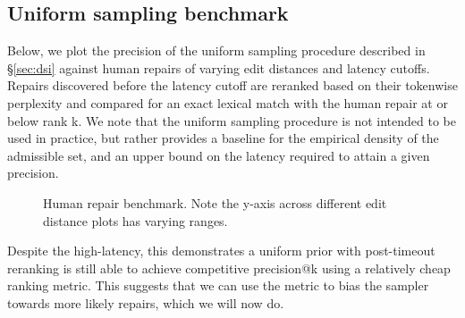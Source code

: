 \documentclass[sigplan,review,anonymous,acmsmall]{acmart}\settopmatter{printfolios=false,printccs=false,printacmref=false}
\begin{document}
\subsection{Uniform sampling benchmark}\label{sec:uniform}

Below, we plot the precision of the uniform sampling procedure described in \S\ref{sec:dsi} against human repairs of varying edit distances and latency cutoffs. Repairs discovered before the latency cutoff are reranked based on their tokenwise perplexity and compared for an exact lexical match with the human repair at or below rank k. We note that the uniform sampling procedure is not intended to be used in practice, but rather provides a baseline for the empirical density of the admissible set, and an upper bound on the latency required to attain a given precision.

\begin{figure}[H]
\resizebox{.3\textwidth}{!}{}
\resizebox{.3\textwidth}{!}{}
\resizebox{.3\textwidth}{!}{}
\caption{Human repair benchmark. Note the y-axis across different edit distance plots has varying ranges.}\label{fig:human}
\end{figure}

Despite the high-latency, this demonstrates a uniform prior with post-timeout reranking is still able to achieve competitive precision@k using a relatively cheap ranking metric. This suggests that we can use the metric to bias the sampler towards more likely repairs, which we will now do.
\end{document}

